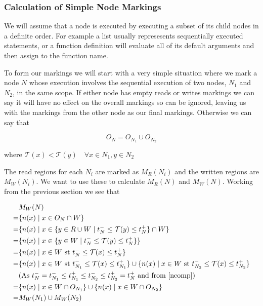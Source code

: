 \documentclass[twoside,a4paper]{report}
\begin{document}
\subsubsection{Calculation of Simple Node Markings}

We will assume that a node is executed by executing a subset of its child nodes in a definite order. For example a list usually represesents
sequentially executed statements, or a function definition will evaluate all of its default arguments and then assign to the function name.

To form our markings we will start with a very simple situation where we mark a node $N$ whose execution involves the sequential execution of two nodes,
$N_1$ and $N_2$, in the same scope. If either node has empty reads or writes markings we can say it will have no effect on the overall markings so can be ignored,
leaving us with the markings from the other node as our final markings. Otherwise we can say that

\begin{equation}\label{ncomp}
O_N = O_{N_1} \cup O_{N_2}
\end{equation}

where $\mathcal{T}(x) < \mathcal{T}(y) \quad \forall x \in N_1, y \in N_2$

The read regions for each $N_i$ are marked as $M_R(N_i)$ and the written regions are $M_W(N_i)$. We want to use these to calculate $M_R(N)$ and $M_W(N)$. Working
from the previous section we see that

\begin{align*}
& M_W(N) \\
=& \{ n(x) \mid x \in O_N \cap W \} \\
=& \{ n(x) \mid x \in \{y \in R \cup W \mid t^{-}_N \le \mathcal{T}(y) \le t^+_N \} \cap W \} \\
=& \{ n(x) \mid x \in \{y \in W \mid t^{-}_N \le \mathcal{T}(y) \le t^+_N \} \} \\
=& \{ n(x) \mid x \in W \text{ st } t^{-}_N \le \mathcal{T}(x) \le t^+_N \} \\
=& \{ n(x) \mid x \in W \text{ st } t^{-}_{N_1} \le \mathcal{T}(x) \le t^+_{N_1} \} \cup
   \{ n(x) \mid x \in W \text{ st } t^{-}_{N_2} \le \mathcal{T}(x) \le t^+_{N_2} \} \\
&  \text{(As } t^-_N = t^-_{N_1} \le t^+_{N_1} \le t^-_{N_2} \le t^+_{N_2} = t^+_N \text{ and from \eqref{ncomp})} \\
=& \{ n(x) \mid x \in W \cap O_{N_1} \} \cup \{ n(x) \mid x \in W \cap O_{N_2} \} \\
=& M_W(N_1) \cup M_W(N_2)
\end{align*}
\end{document}
